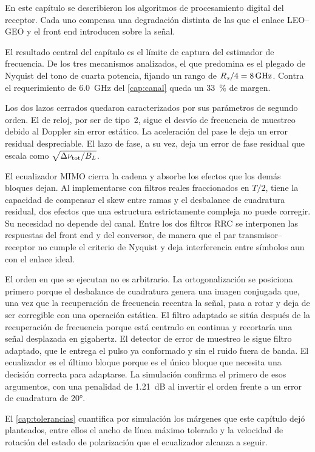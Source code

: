 En este cap\'itulo se describieron los algoritmos de procesamiento digital
del receptor. Cada uno compensa una degradaci\'on distinta de las que el
enlace LEO--GEO y el front end introducen sobre la se\~nal.


El resultado central del cap\'itulo es el l\'imite de captura del estimador de
frecuencia. De los tres mecanismos analizados, el que predomina es el plegado
de Nyquist del tono de cuarta potencia, fijando un rango de $R_{s}/4 = \SI{8}{\giga\hertz}$. Contra el requerimiento de \SI{6.0}{\giga\hertz} del \cref{cap:canal}
queda un \SI{33}{\percent} de margen.

Los dos lazos cerrados quedaron caracterizados por sus par\'ametros de segundo
orden. El de reloj,  por ser de tipo~2, sigue el desv\'io de frecuencia de muestreo 
debido al Doppler sin error
est\'atico. La aceleraci\'on del pase
le deja un error residual despreciable. El lazo de fase, a su vez, deja un
error de fase residual que escala como $\sqrt{\Delta\nu_{\mathrm{tot}}/B_L}$.

El ecualizador MIMO cierra la cadena y absorbe los efectos que los dem\'as bloques
dejan. Al implementarse con filtros reales fraccionados en $T/2$, tiene la capacidad de compensar
el skew entre ramas y el desbalance de cuadratura residual, dos efectos que una
estructura estrictamente compleja no puede corregir. Su necesidad no depende del
canal. Entre los dos filtros RRC se interponen las respuestas del front end y
del conversor, de manera que el par transmisor--receptor no cumple el criterio
de Nyquist y deja interferencia entre s\'imbolos aun con el enlace ideal.

El orden en que se ejecutan no es arbitrario. La ortogonalizaci\'on se posiciona primero
porque el desbalance de cuadratura genera una imagen conjugada que, una vez
que la recuperaci\'on de frecuencia recentra la se\~nal, pasa a rotar y deja
de ser corregible con una operaci\'on est\'atica. El filtro adaptado se sit\'ua
despu\'es de la recuperaci\'on de frecuencia porque est\'a centrado en continua y
recortar\'ia una se\~nal desplazada en gigahertz. El detector de error de
muestreo le sigue filtro adaptado, que le entrega el pulso ya
conformado y sin el ruido fuera de banda. El ecualizador es el \'ultimo bloque porque es
el \'unico bloque que necesita una decisi\'on correcta para adaptarse. La
simulaci\'on confirma el primero de esos argumentos, con una penalidad de
\SI{1.21}{\dB} al invertir el orden frente a un error de cuadratura de
\ang{20}.

El \cref{cap:tolerancias} cuantifica por simulaci\'on los m\'argenes que este
cap\'itulo dej\'o planteados, entre ellos el ancho de l\'inea m\'aximo
tolerado y la velocidad de rotaci\'on del estado de polarizaci\'on que el
ecualizador alcanza a seguir.